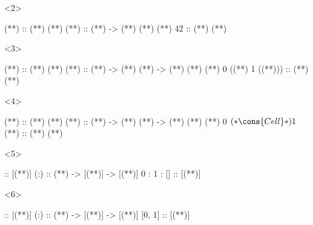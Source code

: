 \documentclass[17pt]{beamer}
\renewcommand{\(}[1]{\begin{columns}[#1]}
\renewcommand{\)}{\end{columns}}
\newcommand{\<}[1]{\begin{column}{#1}}
\renewcommand{\>}{\end{column}}
\begin{document}
\begin{frame}[fragile]
  \begin{minipage}[c][.3\textheight]{\textwidth}
    \begin{center}
      \begin{onlyenv}<2>
        \begin{code}[types]
(**) ::      (**) (**)
(**)    :: (**) -> (**) (**)
(**) 42 ::      (**) (**)
        \end{code}
      \end{onlyenv}
      \begin{onlyenv}<3>
        \begin{code}[types]
                  (**) ::      (**) (**)
                 (**) :: (**) -> (**) (**) -> (**) (**)
(**) 0 ((**) 1 ((**))) :: (**) (**)
        \end{code}
      \end{onlyenv}
      \begin{onlyenv}<4>
        \begin{code}[types]
                  (**) ::      (**) (**)
                 (**) :: (**) -> (**) (**) -> (**) (**)
(**) 0 $ (*\cons{Cell}*) 1 $ (**) :: (**) (**)
        \end{code}
      \end{onlyenv}
      \begin{onlyenv}<5>
        \begin{code}[types]
        [] :: [(**)]
       (:) :: (**) -> [(**)] -> [(**)]
0 : 1 : [] :: [(**)]
        \end{code}
      \end{onlyenv}
      \begin{onlyenv}<6>
        \begin{code}[types]
        [] :: [(**)]
       (:) :: (**) -> [(**)] -> [(**)]
    [0, 1] :: [(**)]
        \end{code}
      \end{onlyenv}
    \end{center}
  \end{minipage}
\end{frame}
\end{document}
